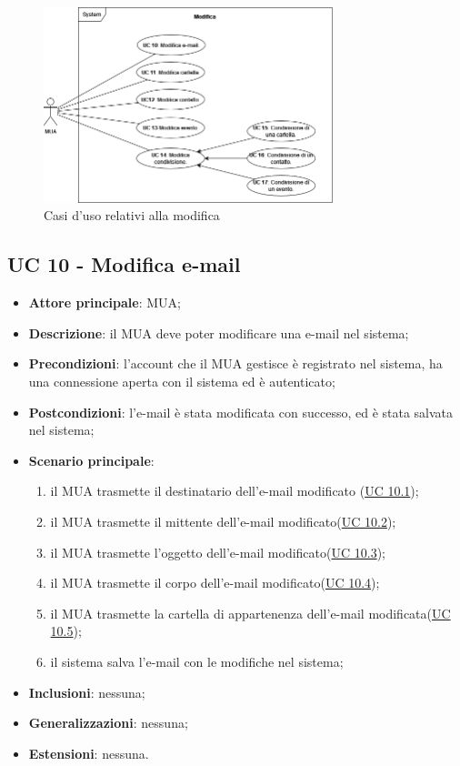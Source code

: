 \begin{figure}[H]
    \includegraphics[width=0.75\textwidth]{sections/uc_imgs/UC-modifica.png}
    \centering
    \caption{Casi d'uso relativi alla modifica}
\end{figure}

\subsection{UC 10 - Modifica e-mail} \label{sec:UC10}
    \begin{itemize}
        \item \textbf{Attore principale}: MUA;
        \item \textbf{Descrizione}: il MUA deve poter modificare una e-mail nel sistema;
        \item \textbf{Precondizioni}: l’account che il MUA gestisce è registrato nel sistema, ha una connessione aperta con il sistema ed è autenticato;
        \item \textbf{Postcondizioni}: l'e-mail è stata modificata con successo, ed è stata salvata nel sistema;
        \item \textbf{Scenario principale}:
            \begin{enumerate}
                \item il MUA trasmette il destinatario dell'e-mail modificato (\hyperref[sec:UC10.1]{UC 10.1});
                \item il MUA trasmette il mittente dell'e-mail modificato(\hyperref[sec:UC10.2]{UC 10.2});
                \item il MUA trasmette l'oggetto dell'e-mail modificato(\hyperref[sec:UC10.3]{UC 10.3});
                \item il MUA trasmette il corpo dell'e-mail modificato(\hyperref[sec:UC10.4]{UC 10.4});
                \item il MUA trasmette la cartella di appartenenza dell'e-mail modificata(\hyperref[sec:UC10.5]{UC 10.5});
                \item il sistema salva l'e-mail con le modifiche nel sistema;
            \end{enumerate}
        \item \textbf{Inclusioni}: nessuna;
        \item \textbf{Generalizzazioni}: nessuna;
        \item \textbf{Estensioni}: nessuna.
    \end{itemize}

